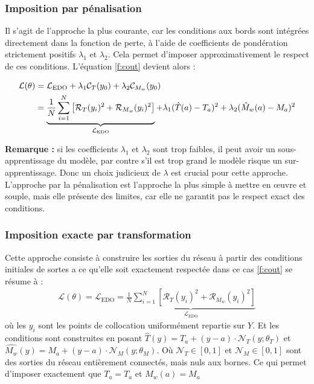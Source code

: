 \documentclass[12pt, oneside]{report} %
\theoremstyle{definition}
\theoremstyle{remark}
\begin{document}
	\subsubsection{Imposition par pénalisation} 
Il s’agit de l’approche la plus courante, car les conditions aux bords sont intégrées directement dans la fonction de perte, à l’aide de coefficients de pondération strictement positifs $\lambda_1$ et $\lambda_2$.  
Cela permet d’imposer approximativement le respect de ces conditions. L’équation \ref{f:cout} devient alors :
		
	\begin{align}\label{f:penalisation}
	\mathcal{L}( \theta ) &= \mathcal{L}_{\text{EDO}} + \lambda_1 \mathcal{C}_T(y_0) + \lambda_2 \mathcal{C}_{M_w} (y_0) \\ \notag&= \underbrace{  \frac{1}{N}\sum_{i=1}^{N}\left[\mathcal{R}_T(y_i)^2 +  \mathcal{R}_{M_w}(y_i)^2\right] }_{\mathcal{L}_{\text{EDO}}} + \lambda_1 {(\hat{T}(a)-T_a)^2 + \lambda_2 (\hat{M}_w(a)-M_a)^2}
\end{align}
			
\textbf{Remarque : }si les coefficients $\lambda_1$ et $\lambda_2$ sont trop faibles, il peut avoir un sous-apprentissage du modèle, par contre s'il est trop grand le modèle risque un sur-apprentissage. Donc un choix judicieux de $\lambda$ est crucial pour cette approche. L'approche par la pénalisation est l'approche la plus simple à mettre en œuvre et souple, mais elle présente des limites, car elle ne garantit pas le respect exact des conditions.		
	
		
		\subsubsection{Imposition exacte par transformation}
		Cette approche consiste à construire les sorties du réseau à partir des conditions initiales de sortes a ce qu'elle soit exactement respectée dans ce cas \eqref{f:cout} se résume à :
		\begin{align}
			\mathcal{L}( \theta ) = \mathcal{L}_{\text{EDO}} = \underbrace{  \frac{1}{N}\sum_{i=1}^{N}\left[\mathcal{R}_T(y_i)^2 +  \mathcal{R}_{M_w}(y_i)^2\right] }_{\mathcal{L}_{\text{EDO}}}
		\end{align}
	où les $y_i$ sont les points de collocation uniformément repartie sur $Y$. Et les conditions sont construites en posant $\hat{T}(y) = T_{a} + (y-a) \cdot\mathcal{N}_T(y; \theta_T)$ et $	\hat{M_w}(y) = M_{a}+ (y-a)\cdot\mathcal{N}_M(y; \theta_M)$.
	Où $\mathcal{N}_T \in [0, 1]$ et $\mathcal{N}_M \in [0, 1]$ sont des sorties du réseau entièrement connectés, mais nuls aux bornes. Ce qui permet d'imposer exactement que $T_{a} = T_{a}$ et  $M_w{(a)} = M_{a}$
		
\end{document}
